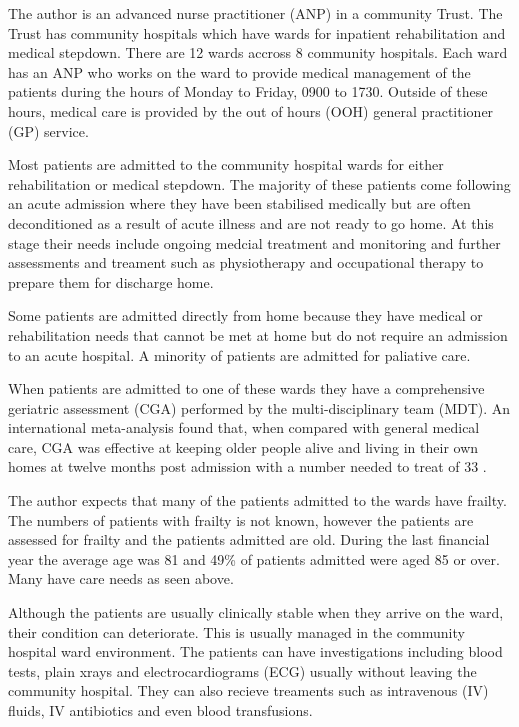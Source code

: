 \documentclass
[
	12pt,
	a4paper,
	oneside,
]{article}
\begin{document}
The author is an advanced nurse practitioner (ANP) in a community Trust.
The Trust has community hospitals which have wards for inpatient rehabilitation and
medical stepdown. There are 12 wards accross 8 community hospitals. Each ward has
an ANP who works on the ward to provide medical management of the patients during 
the hours of Monday to Friday, 0900 to 1730. Outside of these hours, medical care 
is provided by the out of hours (OOH) general practitioner (GP) service. 

Most patients are admitted to the community hospital wards for either rehabilitation
or medical stepdown. The majority of these patients come following an acute admission
where they have been stabilised medically but are often deconditioned as a result
of acute illness and are not ready to go home. At this stage their needs include 
ongoing medcial treatment and monitoring and further assessments and treament such 
as physiotherapy and occupational therapy to prepare them for discharge home.

Some patients are admitted directly from home because they have medical or rehabilitation
needs that cannot be met at home but do not require an admission to an acute hospital.
A minority of patients are admitted for paliative care.

When patients are admitted to one of these wards they have a comprehensive geriatric 
assessment (CGA) \parencite{bgs:14} performed by the multi-disciplinary team (MDT).
An international meta-analysis found that, when compared with general medical care,
CGA was effective at keeping older people alive and living in their own homes at
twelve months post admission with a number needed to treat of 33 \parencite{ellis:11}.

The author expects that many of the patients admitted to the wards have frailty.
The numbers of patients with frailty is not known, however the patients are assessed 
for frailty and the patients admitted are old. During the last financial year the
average age was 81 and 49\% of patients admitted were aged 85 or over. Many have 
care needs as seen above.

Although the patients are usually clinically stable when they arrive on the ward,
their condition can deteriorate. This is usually managed in the community hospital
ward environment. The patients can have investigations including blood tests, plain
xrays and electrocardiograms (ECG) usually without leaving the community hospital.
They can also recieve treaments such as intravenous (IV) fluids, IV antibiotics
and even blood transfusions. 
\end{document}
